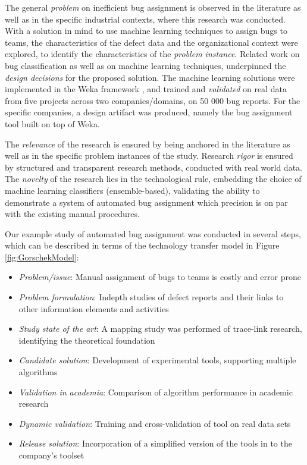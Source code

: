 \documentclass[graybox]{svmult}
\begin{document}
The general \emph{problem} on inefficient bug assignment is observed in the literature as well as in the specific industrial contexts, where this research was conducted. With a solution in mind to use machine learning techniques to assign bugs to teams, the characteristics of the defect data and the organizational context were explored, to identify the characteristics of the \emph{problem instance}. Related work on bug classification as well as on machine learning techniques, underpinned the \emph{design decisions} for the proposed solution. The machine learning solutions were implemented in the Weka framework \cite{hall_weka_2009}, and trained and \emph{validated} on real data from five projects across two companies/domains, on 50 000 bug reports. For the specific companies, a design artifact was produced, namely the bug assignment tool built on top of Weka.

The \emph{relevance} of the research is ensured by being anchored in the literature as well as in the specific problem instances of the study. Research \emph{rigor} is ensured by structured and transparent research methods, conducted with real world data. The \emph{novelty} of the research lies in the technological rule, embedding the choice of machine learning classifiers (ensemble-based), validating the ability to demonstrate a system of automated bug assignment which precision is on par with the existing manual procedures.

Our example study of automated bug assignment was conducted in several steps, which can be described in terms of the technology transfer model in Figure \ref{fig:GorschekModel}:
\begin{itemize}
\item \emph{Problem/issue}: Manual assignment of bugs to teams is costly and error prone
\item \emph{Problem formulation}: Indepth studies of defect reports and their links to other information elements and activities
\item \emph{Study state of the art}: A mapping study was performed of trace-link research, identifying the theoretical foundation \cite{Borg2013EMSE}
\item \emph{Candidate solution}: Development of experimental tools, supporting multiple algorithms
\item \emph{Validation in academia}: Comparison of algorithm performance in academic research \cite{BorgESEM13}
\item \emph{Dynamic validation}: Training and cross-validation of tool on real data sets \cite{JonssonBug15}
\item \emph{Release solution}: Incorporation of a simplified version of the tools in to the company's toolset
\end{itemize} 
\end{document}

